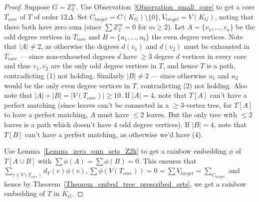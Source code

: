 \documentclass[10pt,a4paper]{amsart}
\begin{document}
\begin{proof}
Suppose $G= \mathbb{Z}_2^m$. Use Observation~\ref{Observation_small_core} to get a core $T_{core}$ of $T$ of order $12\Delta$. Set $C_{target}=C(K_G)\setminus\{0\}, V_{target}=V(K_G)$, noting that these both have zero sum (since $\sum \mathbb{Z}_2^m=0$ for $m\geq 2$).
Let $A=\{v_1, \dots, v_a\}$ be the odd degree vertices in $T_{core}$ and $B=\{u_1, \dots, u_b\}$ the even degree vertices. Note that $|A|\neq 2$, as otherwise the degrees $d(v_1)$ and $d(v_2)$ must be exhausted in $T_{core}$ --- since non-exhausted degrees $d$ have $\geq 3$ degree $d$ vertices in every core and thus $v_1, v_2$ are the only odd degree vertices in $T$, and hence $T$ is a path, contradicting (1) not holding. Similarly $|B|\neq 2$ --- since otherwise $u_1$ and $u_2$ would be the only even degree vertices in $T$, contradicting (2) not holding.
 Also note that $|A|+|B|=|V(T_{core})|\geq 10$. If $|A|=4$, note that $T[A]$ can't have  a perfect matching (since leaves can't be connected in a $\ge 3$-vertex tree, for $T[A]$ to have a perfect matching, $A$ must have $\le 2$ leaves. But the only tree with $\le 2$ leaves is a path which doesn't have $4$ odd degree vertices). If $|B|=4$, note that $T[B]$ can't have  a perfect matching, as otherwise we'd have (4).
 
 Use Lemma~\ref{Lemma_zero_sum_sets_Z2k} to get a rainbow embedding $\phi$ of $T[A\cup B]$ with $\sum \phi(A)=\sum \phi(B)=0$. This ensures that $\sum_{v\in V(T_{core})}d_T(v)\phi(v), \sum \phi(V(T_{core}))=0=\sum V_{target}=\sum_{C_{target}}$ and hence by Theorem~\ref{Theorem_embed_tree_prescribed_sets},  we get a rainbow embedding of $T$ in $K_G$.
\end{proof}
\end{document}
